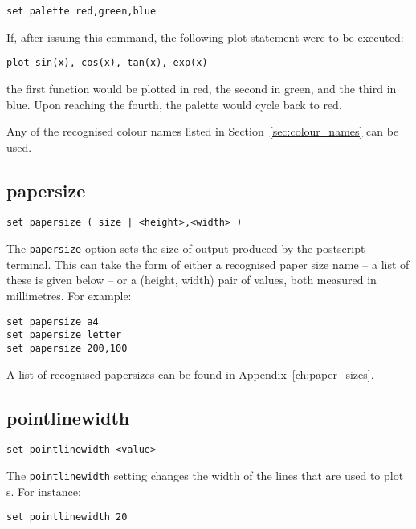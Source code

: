 \begin{verbatim}
set palette red,green,blue
\end{verbatim}

If, after issuing this command, the following plot statement were to be
executed:

\begin{verbatim}
plot sin(x), cos(x), tan(x), exp(x)
\end{verbatim}

\noindent the first function would be plotted in red, the second in green, and the third
in blue. Upon reaching the fourth, the palette would cycle back to red.

Any of the recognised colour names listed in Section~\ref{sec:colour_names} can be used.


\subsection{papersize}

\begin{verbatim}
set papersize ( size | <height>,<width> )
\end{verbatim}

The {\tt papersize} option sets the size of output produced by the postscript
terminal. This can take the form of either a recognised paper size name -- a
list of these is given below -- or a (height, width) pair of values, both measured
in millimetres. For example:

\begin{verbatim}
set papersize a4
set papersize letter
set papersize 200,100
\end{verbatim}

A list of recognised papersizes can be found in Appendix~\ref{ch:paper_sizes}.


\subsection{pointlinewidth}

\begin{verbatim}
set pointlinewidth <value>
\end{verbatim}

The {\tt pointlinewidth} setting changes the width of the lines that are used to
plot \datapoint s.  For instance:

\begin{verbatim}
set pointlinewidth 20
\end{verbatim}

